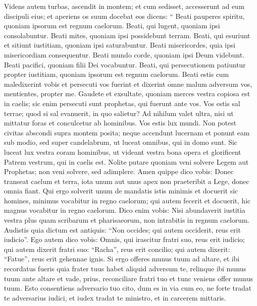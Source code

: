 \begin{biblechapter}
\begin{biblechapter}
\begin{biblechapter}
\begin{biblechapter}
\begin{biblechapter}
\verse Videns autem turbas, ascendit in montem; et cum sedisset, accesserunt ad eum discipuli eius; 
\verse et aperiens os suum docebat eos dicens:
 \verse “ Beati pauperes spiritu, quoniam ipsorum est regnum caelorum.
 \verse Beati, qui lugent, quoniam ipsi consolabuntur.
 \verse Beati mites, quoniam ipsi possidebunt terram.
 \verse Beati, qui esuriunt et sitiunt iustitiam, quoniam ipsi saturabuntur.
 \verse Beati misericordes, quia ipsi misericordiam consequentur.
 \verse Beati mundo corde, quoniam ipsi Deum videbunt.
 \verse Beati pacifici, quoniam filii Dei vocabuntur.
 \verse Beati, qui persecutionem patiuntur propter iustitiam, quoniam ipsorum est regnum caelorum.
 \verse Beati estis cum maledixerint vobis et persecuti vos fuerint et dixerint omne malum adversum vos, mentientes, propter me. 
\verse Gaudete et exsultate, quoniam merces vestra copiosa est in caelis; sic enim persecuti sunt prophetas, qui fuerunt ante vos.
 \verse Vos estis sal terrae; quod si sal evanuerit, in quo salietur? Ad nihilum valet ultra, nisi ut mittatur foras et conculcetur ab hominibus.
 \verse Vos estis lux mundi. Non potest civitas abscondi supra montem posita; 
\verse neque accendunt lucernam et ponunt eam sub modio, sed super candelabrum, ut luceat omnibus, qui in domo sunt. 
\verse Sic luceat lux vestra coram hominibus, ut videant vestra bona opera et glorificent Patrem vestrum, qui in caelis est.
 \verse Nolite putare quoniam veni solvere Legem aut Prophetas; non veni solvere, sed adimplere. 
\verse Amen quippe dico vobis: Donec transeat caelum et terra, iota unum aut unus apex non praeteribit a Lege, donec omnia fiant. 
\verse Qui ergo solverit unum de mandatis istis minimis et docuerit sic homines, minimus vocabitur in regno caelorum; qui autem fecerit et docuerit, hic magnus vocabitur in regno caelorum.
 \verse Dico enim vobis: Nisi abundaverit iustitia vestra plus quam scribarum et pharisaeorum, non intrabitis in regnum caelorum.
 \verse Audistis quia dictum est antiquis: “Non occides; qui autem occiderit, reus erit iudicio”. 
\verse Ego autem dico vobis: Omnis, qui irascitur fratri suo, reus erit iudicio; qui autem dixerit fratri suo: “Racha”, reus erit concilio; qui autem dixerit: “Fatue”, reus erit gehennae ignis. 
\verse Si ergo offeres munus tuum ad altare, et ibi recordatus fueris quia frater tuus habet aliquid adversum te, 
\verse relinque ibi munus tuum ante altare et vade, prius, reconciliare fratri tuo et tunc veniens offer munus tuum. 
\verse Esto consentiens adversario tuo cito, dum es in via cum eo, ne forte tradat te adversarius iudici, et iudex tradat te ministro, et in carcerem mittaris. 

\end{biblechapter}
\end{biblechapter}
\end{biblechapter}
\end{biblechapter}
\end{biblechapter}

